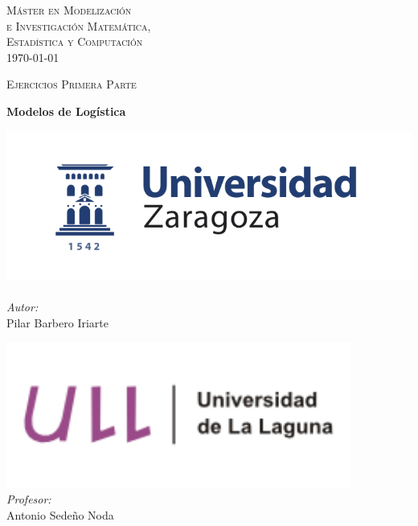 \documentclass[a4paper,12pt]{article}
\author{Pilar Barbero Iriarte}
\begin{document}
\begin{titlepage}
\begin{center}



\textsc{\LARGE M\'aster en Modelizaci\'on \\e Investigaci\'on Matem\'atica,\\ Estad\'istica y Computaci\'on }\\[1.5cm]
{\large \today}

\textsc{Ejercicios Primera Parte}\\[0.5cm]

\vfill

{ \huge \bfseries Modelos de Log\'istica \\[0.4cm] }

\vfill



\noindent
\begin{minipage}{0.4\textwidth}
\begin{flushleft} \large
\includegraphics[width=1.1\textwidth]{../logoUZ.png}~\\[1cm]
\emph{Autor:}\\
Pilar Barbero Iriarte 
\end{flushleft}
\end{minipage}%
\begin{minipage}{0.4\textwidth}
\begin{flushright} \large
\includegraphics[width=0.85\textwidth]{../logoULL.png}~\\[1cm]
\emph{Profesor:} \\
Antonio Sede\~no Noda
\end{flushright}
\end{minipage}

\end{center}


\end{titlepage}
\end{document}
